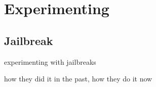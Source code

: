 \chapter{Experimenting}

\section{Jailbreak}
experimenting with jailbreaks

how they did it in the past, how they do it now